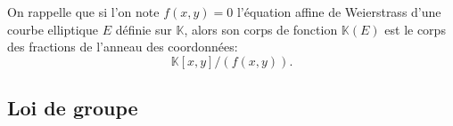 \documentclass[10pt,a4paper]{book}
\theoremstyle{plain}
\theoremstyle{definition}
\theoremstyle{definition}
\theoremstyle{definition}
\theoremstyle{definition}
\theoremstyle{remark}
\theoremstyle{remark}
\theoremstyle{definition}
\begin{document}
On rappelle que si l'on note $f(x,y)=0$ l'équation affine de Weierstrass d'une courbe elliptique $E$ définie sur $\mathbb{K}$, alors son corps de fonction $\mathbb{K}(E)$ est le corps des fractions de l'anneau des coordonnées:
\begin{equation*}
\mathbb{K}[x,y]/(f(x,y)).
\end{equation*}

\subsection{Loi de groupe}
%
\end{document}
